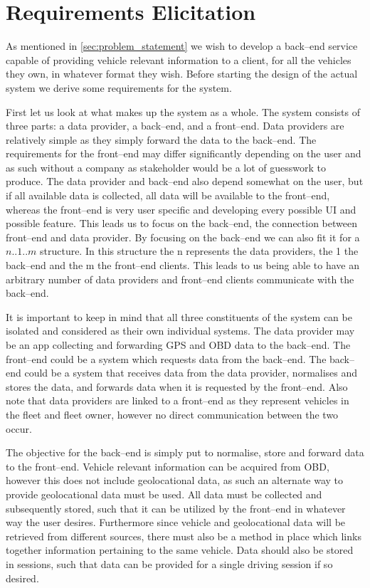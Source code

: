 \chapter{Requirements Elicitation}\label{cha:requirements_elicitation}
As mentioned in \cref{sec:problem_statement} we wish to develop a back--end service capable of providing vehicle relevant information to a client, for all the vehicles they own, in whatever format they wish.
Before starting the design of the actual system we derive some requirements for the system.

First let us look at what makes up the system as a whole. 
The system consists of three parts: a data provider, a back--end, and a front--end.
Data providers are relatively simple as they simply forward the data to the back--end.
The requirements for the front--end may differ significantly depending on the user and as such without a company as stakeholder would be a lot of guesswork to produce.
The data provider and back--end also depend somewhat on the user, but if all available data is collected, all data will be available to the front--end, whereas the front--end is very user specific and developing every possible UI and possible feature.
This leads us to focus on the back--end, the connection between front--end and data provider. 
By focusing on the back--end we can also fit it for a $n..1..m$ structure.
In this structure the n represents the data providers, the 1 the back--end and the m the front--end clients.
This leads to us being able to have an arbitrary number of data providers and front--end clients communicate with the back--end.

It is important to keep in mind that all three constituents of the system can be isolated and considered as their own individual systems.
The data provider may be an app collecting and forwarding GPS and \ac{OBD} data to the back--end.
The front--end could be a system which requests data from the back--end.
The back--end could be a system that receives data from the data provider, normalises and stores the data, and forwards data when it is requested by the front--end.
Also note that data providers are linked to a front--end as they represent vehicles in the fleet and fleet owner, however no direct communication between the two occur.

\bigskip
The objective for the back--end is simply put to normalise, store and forward data to the front--end.
Vehicle relevant information can be acquired from \ac{OBD}, however this does not include geolocational data, as such an alternate way to provide geolocational data must be used.
All data must be collected and subsequently stored, such that it can be utilized by the front--end in whatever way the user desires.
Furthermore since vehicle and geolocational data will be retrieved from different sources, there must also be a method in place which links together information pertaining to the same vehicle.
Data should also be stored in sessions, such that data can be provided for a single driving session if so desired.

